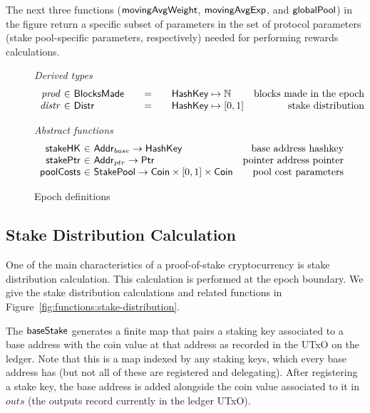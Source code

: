 The next three functions ($\mathsf{movingAvgWeight}$, $\mathsf{movingAvgExp}$, and
$\mathsf{globalPool}$) in the figure return a specific subset of parameters
in the set of protocol parameters (stake pool-specific parameters, respectively)
needed for performing rewards calculations.

\begin{figure}[htb]
  \emph{Derived types}
  \begin{equation*}
    \begin{array}{r@{~\in~}l@{\qquad=\qquad}lr}
      \var{prod}
      & \BlocksMade
      & \HashKey \mapsto \mathbb{N}
      & \text{blocks made in the epoch} \\
      \var{distr}
      & \Distr
      & \HashKey \mapsto [0,1]
      & \text{stake distribution} \\
    \end{array}
  \end{equation*}


  \emph{Abstract functions}
  \begin{equation*}
    \begin{array}{r@{~\in~}lr}
      \fun{stakeHK} & \Addr_{base} \to \HashKey
      & \text{base address hashkey}\\
      \fun{stakePtr} & \Addr_{ptr} \to \Ptr
      & \text{pointer address pointer}\\
      \fun{poolCosts} & \StakePool \to \Coin\times [0,1] \times \Coin
      & \text{pool cost parameters}\\
    \end{array}
  \end{equation*}
  \caption{Epoch definitions}
  \label{fig:epoch-defs}
\end{figure}

\subsection{Stake Distribution Calculation}
\label{sec:stake-dist}

One of the main characteristics of a proof-of-stake cryptocurrency is stake
distribution calculation. This calculation is performed at the epoch boundary.
We give the stake distribution calculations and related functions in
Figure~\ref{fig:functions:stake-distribution}.

The $\mathsf{baseStake}$ generates a finite map that pairs a staking key
associated to a base address with the coin value at that address as recorded
in the UTxO on the ledger. Note that this is a map indexed by any staking keys,
which every base address has (but not all of these are registered and delegating).
After registering a stake key, the base address is added alongside the
coin value associated to it in $outs$ (the outputs record currently in the
ledger UTxO).

